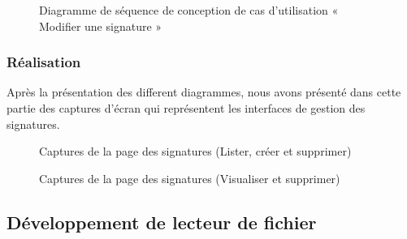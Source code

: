 \begin{figure}[H]
  \centering
  \caption{Diagramme de séquence de conception de cas d'utilisation « Modifier une signature  »}
  \label{fig:sequence_conception_update_signature}
\end{figure}

\subsubsection{Réalisation}

Après la présentation des different diagrammes, nous avons présenté dans cette partie des captures d'écran qui représentent les interfaces de gestion des signatures.
\begin{figure}[H]
  \centering
  \caption{Captures de la page des signatures (Lister, créer et supprimer)}
  \label{fig:realisation_signatures}
\end{figure}

\begin{figure}[H]
  \centering
  \caption{Captures de la page des signatures (Visualiser et supprimer)}
  \label{fig:realisation_preview_delete_signature}
\end{figure}


\subsection{Développement de lecteur de fichier}
